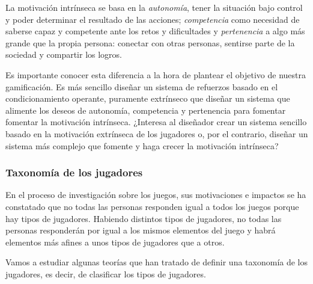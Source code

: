 La motivación intrínseca se basa en la \textit{autonomía}, tener la situación bajo control y poder determinar el resultado de las acciones; \textit{competencia} como necesidad de saberse capaz y competente ante los retos y dificultades y \textit{pertenencia} a algo más grande que la propia persona: conectar con otras personas, sentirse parte de la sociedad y compartir los logros.


Es importante conocer esta diferencia a la hora de plantear el objetivo de nuestra gamificación. 
%
Es más sencillo diseñar un sistema de refuerzos basado en el condicionamiento operante, puramente extrínseco que diseñar un sistema que alimente los deseos de autonomía, competencia y pertenencia para fomentar fomentar la motivación intrínseca.
%
¿Interesa al diseñador crear un sistema sencillo basado en la motivación extrínseca de los jugadores o, por el contrario, diseñar un sistema más complejo que fomente y haga crecer la motivación intrínseca?


\subsubsection{Taxonomía de los jugadores}

%
En el proceso de investigación sobre los juegos, sus motivaciones e impactos se ha constatado que no todas las personas responden igual a todos los juegos porque hay tipos de jugadores. 
%
Habiendo distintos tipos de jugadores, no todas las personas responderán por igual a los mismos elementos del juego y habrá elementos más afines a unos tipos de jugadores que a otros.

Vamos a estudiar algunas teorías que han tratado de definir una taxonomía de los jugadores, es decir, de clasificar los tipos de jugadores.

